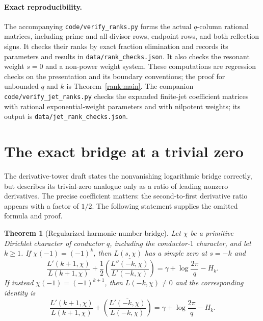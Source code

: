 \documentclass[11pt,a4paper]{article}
\newtheorem{theorem}{Theorem}[section]
\theoremstyle{definition}
\theoremstyle{remark}
\numberwithin{equation}{section}
\begin{document}
\paragraph{Exact reproducibility.}
The accompanying \texttt{code/verify\_ranks.py} forms the actual
$q$-column rational matrices, including prime and all-divisor rows,
endpoint rows, and both reflection signs.  It checks their ranks by
exact fraction elimination and records its parameters and results in
\texttt{data/rank\_checks.json}.  It also checks the resonant weight
$s=0$ and a non-power weight system.  These computations are regression
checks on the presentation and its boundary conventions; the proof for
unbounded $q$ and $k$ is Theorem~\ref{rank:main}.
The companion \texttt{code/verify\_jet\_ranks.py} checks the expanded
finite-jet coefficient matrices with rational exponential-weight
parameters and with nilpotent weights; its output is
\texttt{data/jet\_rank\_checks.json}.

\section{The exact bridge at a trivial zero}
\label{bridge:section}

The derivative-tower draft states the nonvanishing logarithmic bridge
correctly, but describes its trivial-zero analogue only as a ratio of
leading nonzero derivatives.  The precise coefficient matters: the
second-to-first derivative ratio appears with a factor of $1/2$.
The following statement supplies the omitted formula and proof.

\begin{theorem}[Regularized harmonic-number bridge]\label{bridge:trivial}
Let $\chi$ be a primitive Dirichlet character of conductor $q$, including
the conductor-$1$ character, and let $k\geq1$.  If
$\chi(-1)=(-1)^k$, then $L(s,\chi)$ has a simple zero at $s=-k$ and
\begin{equation}\label{bridge:formula}
 \frac{L'(k+1,\chi)}{L(k+1,\chi)}
 +\frac12\overline{\left(
       \frac{L''(-k,\chi)}{L'(-k,\chi)}\right)}
 =\gamma+\log\frac{2\pi}{q}-H_k.
\end{equation}
If instead $\chi(-1)=(-1)^{k+1}$, then $L(-k,\chi)\ne0$ and the
corresponding identity is
\begin{equation}\label{bridge:nontrivial}
 \frac{L'(k+1,\chi)}{L(k+1,\chi)}
 +\overline{\left(
       \frac{L'(-k,\chi)}{L(-k,\chi)}\right)}
 =\gamma+\log\frac{2\pi}{q}-H_k.
\end{equation}
\end{theorem}
\end{document}
